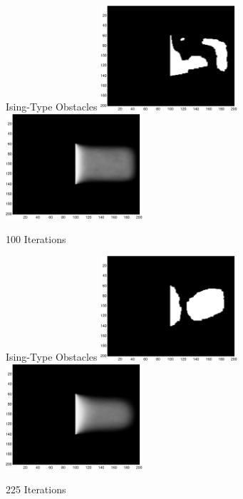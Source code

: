 \addtocounter{framenumber}{-1}
\begin{tframe}{Ising-Type Obstacles}
\includegraphics[width=2in]{media_exploration/ising100}
\includegraphics[width=2in]{media_exploration/marg100}

100 Iterations
\end{tframe}

\addtocounter{framenumber}{-1}
\begin{tframe}{Ising-Type Obstacles}
\includegraphics[width=2in]{media_exploration/ising225}
\includegraphics[width=2in]{media_exploration/marg225}

225 Iterations
\end{tframe}

